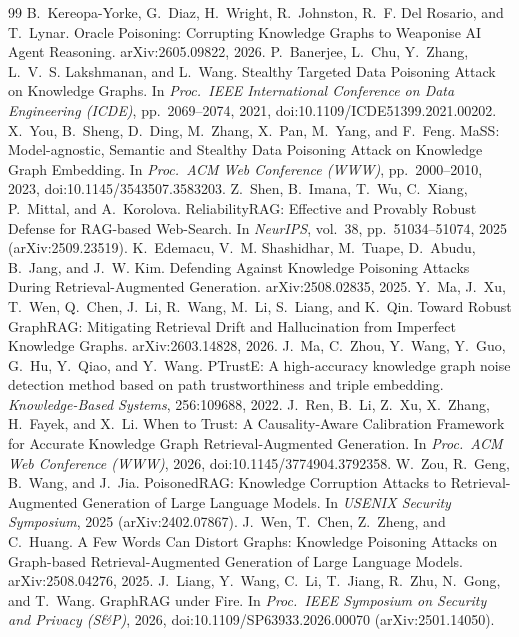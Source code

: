\documentclass[preprint,12pt]{elsarticle}
\begin{document}
\begin{thebibliography}{99}
 B.~Kereopa-Yorke, G.~Diaz, H.~Wright, R.~Johnston, R.~F. Del Rosario, and T.~Lynar. Oracle Poisoning: Corrupting Knowledge Graphs to Weaponise AI Agent Reasoning. arXiv:2605.09822, 2026.
 P.~Banerjee, L.~Chu, Y.~Zhang, L.~V.~S. Lakshmanan, and L.~Wang. Stealthy Targeted Data Poisoning Attack on Knowledge Graphs. In \emph{Proc.\ IEEE International Conference on Data Engineering (ICDE)}, pp.~2069--2074, 2021, doi:10.1109/ICDE51399.2021.00202.
 X.~You, B.~Sheng, D.~Ding, M.~Zhang, X.~Pan, M.~Yang, and F.~Feng. MaSS: Model-agnostic, Semantic and Stealthy Data Poisoning Attack on Knowledge Graph Embedding. In \emph{Proc.\ ACM Web Conference (WWW)}, pp.~2000--2010, 2023, doi:10.1145/3543507.3583203.
 Z.~Shen, B.~Imana, T.~Wu, C.~Xiang, P.~Mittal, and A.~Korolova. ReliabilityRAG: Effective and Provably Robust Defense for RAG-based Web-Search. In \emph{NeurIPS}, vol.~38, pp.~51034--51074, 2025 (arXiv:2509.23519).
 K.~Edemacu, V.~M. Shashidhar, M.~Tuape, D.~Abudu, B.~Jang, and J.~W. Kim. Defending Against Knowledge Poisoning Attacks During Retrieval-Augmented Generation. arXiv:2508.02835, 2025.
 Y.~Ma, J.~Xu, T.~Wen, Q.~Chen, J.~Li, R.~Wang, M.~Li, S.~Liang, and K.~Qin. Toward Robust GraphRAG: Mitigating Retrieval Drift and Hallucination from Imperfect Knowledge Graphs. arXiv:2603.14828, 2026.
 J.~Ma, C.~Zhou, Y.~Wang, Y.~Guo, G.~Hu, Y.~Qiao, and Y.~Wang. PTrustE: A high-accuracy knowledge graph noise detection method based on path trustworthiness and triple embedding. \emph{Knowledge-Based Systems}, 256:109688, 2022.
 J.~Ren, B.~Li, Z.~Xu, X.~Zhang, H.~Fayek, and X.~Li. When to Trust: A Causality-Aware Calibration Framework for Accurate Knowledge Graph Retrieval-Augmented Generation. In \emph{Proc.\ ACM Web Conference (WWW)}, 2026, doi:10.1145/3774904.3792358.
 W.~Zou, R.~Geng, B.~Wang, and J.~Jia. PoisonedRAG: Knowledge Corruption Attacks to Retrieval-Augmented Generation of Large Language Models. In \emph{USENIX Security Symposium}, 2025 (arXiv:2402.07867).
 J.~Wen, T.~Chen, Z.~Zheng, and C.~Huang. A Few Words Can Distort Graphs: Knowledge Poisoning Attacks on Graph-based Retrieval-Augmented Generation of Large Language Models. arXiv:2508.04276, 2025.
 J.~Liang, Y.~Wang, C.~Li, T.~Jiang, R.~Zhu, N.~Gong, and T.~Wang. GraphRAG under Fire. In \emph{Proc.\ IEEE Symposium on Security and Privacy (S\&P)}, 2026, doi:10.1109/SP63933.2026.00070 (arXiv:2501.14050).

\end{thebibliography}
\end{document}
